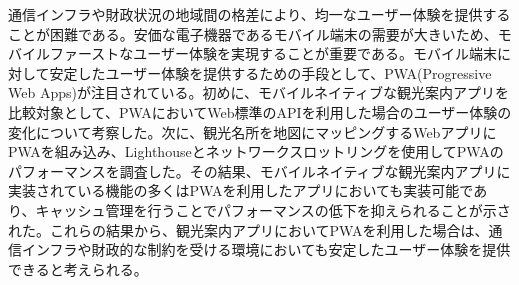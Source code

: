 通信インフラや財政状況の地域間の格差により、均一なユーザー体験を提供することが困難である。安価な電子機器であるモバイル端末の需要が大きいため、モバイルファーストなユーザー体験を実現することが重要である。モバイル端末に対して安定したユーザー体験を提供するための手段として、PWA(Progressive Web Apps)が注目されている。初めに、モバイルネイティブな観光案内アプリを比較対象として、PWAにおいてWeb標準のAPIを利用した場合のユーザー体験の変化について考察した。次に、観光名所を地図にマッピングするWebアプリにPWAを組み込み、Lighthouseとネットワークスロットリングを使用してPWAのパフォーマンスを調査した。その結果、モバイルネイティブな観光案内アプリに実装されている機能の多くはPWAを利用したアプリにおいても実装可能であり、キャッシュ管理を行うことでパフォーマンスの低下を抑えられることが示された。これらの結果から、観光案内アプリにおいてPWAを利用した場合は、通信インフラや財政的な制約を受ける環境においても安定したユーザー体験を提供できると考えられる。